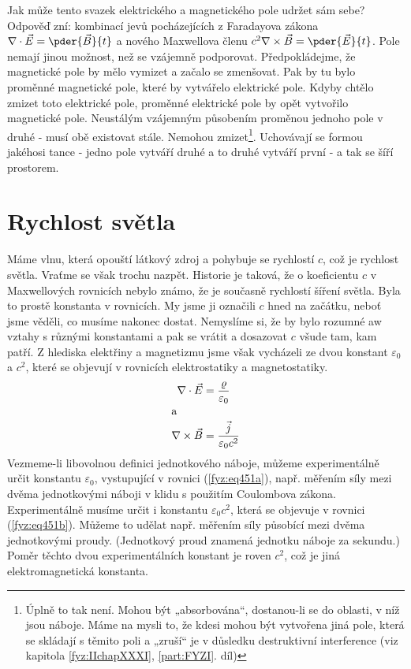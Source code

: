   Jak může tento svazek elektrického a magnetického pole udržet sám sebe? Odpověď zní: kombinací 
  jevů pocházejících z Faradayova zákona \(\nabla\cdot\vec{E} = \pder{\vec{B}}{t}\) a nového 
  Maxwellova členu \(c^2\nabla\times\vec{B} =\pder{\vec{E}}{t}\). Pole nemají jinou možnost, než 
  se vzájemně podporovat. Předpokládejme, že magnetické pole by mělo vymizet a začalo se zmenšovat. 
  Pak by tu bylo proměnné magnetické pole, které by vytvářelo elektrické pole. Kdyby chtělo zmizet 
  toto elektrické pole, proměnné elektrické pole by opět vytvořilo magnetické pole. Neustálým 
  vzájemným působením proměnou jednoho pole v druhé - musí obě existovat stále. Nemohou 
  zmizet\footnote{ Úplně to tak není. Mohou být „absorbována“, dostanou-li se do oblasti, v níž 
  jsou náboje. Máme na mysli to, že kdesi mohou být vytvořena jiná pole, která se skládají s těmito 
  poli a „zruší“ je v důsledku destruktivní interference (viz kapitola \ref{fyz:IIchapXXXI}, 
  \ref{part:FYZI}. díl)}. Uchovávají se formou jakéhosi tance - jedno pole vytváří druhé a to druhé 
  vytváří první - a tak se šíří prostorem.

\section{Rychlost světla}\label{fyz:IIchapXVIIIsecIV}
  Máme vlnu, která opouští látkový zdroj a pohybuje se rychlostí \(c\), což je rychlost světla. 
  Vraťme se však trochu nazpět. Historie je taková, že o koeficientu \(c\) v Maxwellových rovnicích 
  nebylo známo, že je současně rychlostí šíření světla. Byla to prostě konstanta v rovnicích. My 
  jsme ji označili \(c\) hned na začátku, neboť jsme věděli, co musíme nakonec dostat. Nemyslíme 
  si, že by bylo rozumné aw vztahy s různými konstantami a pak se vrátit a dosazovat \(c\) všude 
  tam, kam patří. Z hlediska elektřiny a magnetizmu jsme však vycházeli ze dvou konstant 
  \(\varepsilon_0\) a \(c^2\), které se objevují v rovnicích elektrostatiky a magnetostatiky.
  \begin{subequations}\label{fyz:eq451}
    \begin{align}
      \nabla\cdot\vec{E}  &= \frac{\varrho}{\varepsilon_0}    \label{fyz:eq451a}\\
      \shortintertext{a} 
      \nabla\times\vec{B} &= \frac{\vec{j}}{\varepsilon_0c^2} \label{fyz:eq451b}
    \end{align}
  \end{subequations}
  Vezmeme-li libovolnou definici jednotkového náboje, můžeme experimentálně určit konstantu 
  \(\varepsilon_0\), vystupující v rovnici (\ref{fyz:eq451a}), např. měřením síly mezi dvěma 
  jednotkovými náboji v klidu s použitím Coulombova zákona. Experimentálně musíme určit i konstantu 
  \(\varepsilon_0c^2\), která se objevuje v rovnici (\ref{fyz:eq451b}). Můžeme to udělat např. 
  měřením síly působící mezi dvěma jednotkovými proudy. (Jednotkový proud znamená jednotku náboje 
  za sekundu.) Poměr těchto dvou experimentálních konstant je roven \(c^2\), což je jiná 
  elektromagnetická konstanta. 
 
